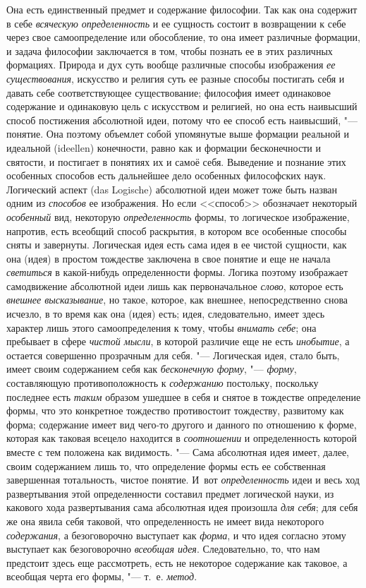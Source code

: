 {{Она есть единственный предмет и содержание философии. Так как
она содержит в себе {\em всяческую
определенность} и ее сущность состоит в возвращении к себе
через свое самоопределение или обособление, то она имеет различные
формации, и задача философии заключается в том, чтобы познать ее в этих
различных формациях. Природа и дух суть вообще различные способы
изображения {\em ее существования},
искусство и религия суть ее разные способы постигать себя и
давать себе соответствующее существование; философия имеет одинаковое
содержание и одинаковую цель с искусством и религией, но она
есть наивысший способ постижения абсолютной идеи, потому что ее способ есть
наивысший, "--- понятие. Она поэтому объемлет собой упомянутые
выше формации реальной и идеальной (ideellen) конечности,
равно как и формации бесконечности и святости, и постигает в понятиях их и
самоё себя. Выведение и познание этих особенных способов есть дальнейшее
дело особенных философских наук. Логический аспект (das Logische)
абсолютной идеи может тоже быть назван одним из
{\em способов} ее
изображения. Но если <<способ>> обозначает некоторый
{\em особенный} вид,
некоторую {\em определенность}
формы, то логическое изображение, напротив, есть всеобщий
способ раскрытия, в котором все особенные способы сняты и завернуты.
Логическая идея есть сама идея в ее чистой сущности, как она (идея) в
простом тождестве заключена в свое понятие и еще не начала
{\em светиться} в
какой-нибудь определенности формы. Логика поэтому изображает самодвижение
абсолютной идеи лишь как первоначальное
{\em слово}, которое есть
{\em внешнее высказывание},
но такое, которое, как внешнее, непосредственно снова
исчезло, в то время как она (идея) есть; идея, следовательно, имеет здесь
характер лишь этого самоопределения к тому, чтобы
{\em внимать себе}; она
пребывает в сфере {\em чистой мысли},
в которой различие еще не есть
{\em инобытие}, а
остается совершенно прозрачным для себя. "--- Логическая идея,
стало быть, имеет своим содержанием себя как
{\em бесконечную форму}, "---
{\em форму}, составляющую
противоположность к {\em содержанию}
постольку, поскольку последнее есть
{\em таким} образом
ушедшее в себя и снятое в тождестве определение формы, что это конкретное
тождество противостоит тождеству, развитому как форма; содержание имеет вид
чего-то другого и данного по отношению к форме, которая как таковая всецело
находится в {\em соотношении}
и определенность которой вместе с тем положена как
видимость. "--- Сама абсолютная идея имеет, далее, своим
содержанием лишь то, что определение формы есть ее собственная завершенная
тотальность, чистое понятие. И~вот
{\em определенность} идеи
и весь ход развертывания этой определенности составил предмет логической
науки, из какового хода развертывания сама абсолютная идея произошла
{\em для себя}; для себя
же она явила себя таковой, что определенность не имеет вида некоторого
{\em содержания}, а
безоговорочно выступает как
{\em форма}, и что идея
согласно этому выступает как безоговорочно
{\em всеобщая идея}.
Следовательно, то, что нам предстоит здесь еще рассмотреть,
есть не некоторое содержание как таковое, а всеобщая черта его формы, "---
т.~е. {\em метод}.

}}

